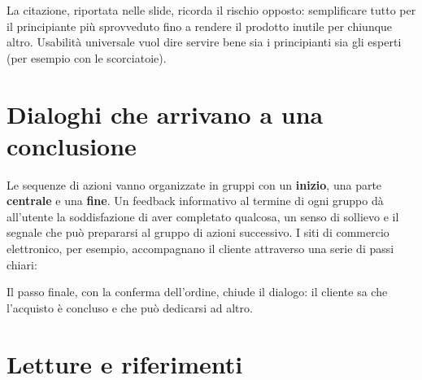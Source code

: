 La citazione, riportata nelle slide, ricorda il rischio opposto: semplificare tutto per il principiante più sprovveduto
fino a rendere il prodotto inutile per chiunque altro. Usabilità universale vuol dire servire bene sia i principianti
sia gli esperti (per esempio con le scorciatoie).

\section{Dialoghi che arrivano a una conclusione}

Le sequenze di azioni vanno organizzate in gruppi con un \textbf{inizio}, una parte \textbf{centrale} e una
\textbf{fine}. Un feedback informativo al termine di ogni gruppo dà all'utente la soddisfazione di aver completato
qualcosa, un senso di sollievo e il segnale che può prepararsi al gruppo di azioni successivo. I siti di commercio
elettronico, per esempio, accompagnano il cliente attraverso una serie di passi chiari:

\begin{center}
\end{center}

Il passo finale, con la conferma dell'ordine, chiude il dialogo: il cliente sa che l'acquisto è concluso e che può
dedicarsi ad altro.

\section{Letture e riferimenti}

